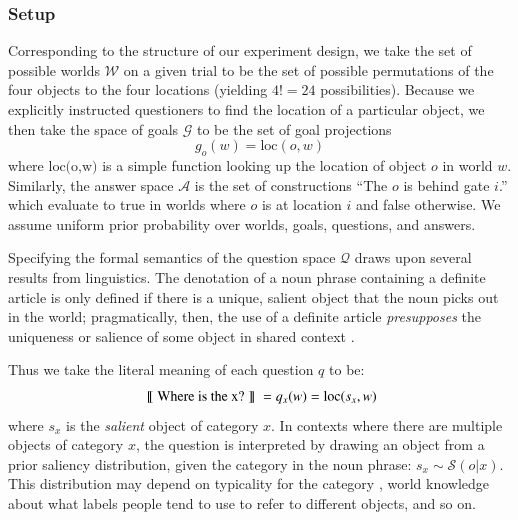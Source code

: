 \documentclass[11pt, floatsintext]{apa6}
\newcommand{\den}[2][]{
\(
\left\llbracket\;\text{#2}\;\right\rrbracket^{#1}
\)
}
\begin{document}

\subsubsection{Setup} 
Corresponding to the structure of our experiment design, we take the set of possible worlds $\mathcal{W}$ on a given trial to be the set of possible permutations of the four objects to the four locations (yielding $4! = 24$ possibilities). 
Because we explicitly instructed questioners to find the location of a particular object, we then take the space of goals $\mathcal{G}$ to be the set of goal projections $$g_o(w) = \textrm{loc}(o,w)$$ where $\textrm{loc(o,w)}$ is a simple function looking up the location of object $o$ in world $w$. 
Similarly, the answer space $\mathcal{A}$ is the set of constructions ``The $o$ is behind gate $i$.'' which evaluate to true in worlds where $o$ is at location $i$ and false otherwise.
We assume uniform prior probability over worlds, goals, questions, and answers. 

Specifying the formal semantics of the question space $\mathcal{Q}$ draws upon several results from linguistics. 
The denotation of a noun phrase containing a definite article is only defined if there is a unique, salient object that the noun picks out in the world; pragmatically, then, the use of a definite article \emph{presupposes} the uniqueness or salience of some object in shared context \cite{Lewis79_Scorekeeping, clark1983common, Roberts03_UniquenessDefiniteNounPhrases}. 

Thus we take the literal meaning of each question $q$ to be: 
$$\textrm{\den{Where is the x?}} = q_{x}(w) = \textrm{loc}(s_x,w)$$ where $s_x$ is the \emph{salient} object of category $x$. 
In contexts where there are multiple objects of category $x$, the question is interpreted by drawing an object from a prior saliency distribution, given the category in the noun phrase: $s_x \sim \mathcal{S}(o | x)$. 
This distribution may depend on typicality for the category \cite{Rosch75}, world knowledge about what labels people tend to use to refer to different objects, and so on. 
\end{document}
